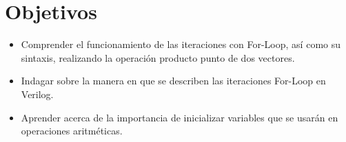 \section{Objetivos \label{sec:obj}}


\begin{itemize} 
	\item Comprender el funcionamiento de las iteraciones con For-Loop, así como su sintaxis, realizando la operación producto punto de dos vectores.
	
	\item Indagar sobre la manera en que se describen las iteraciones For-Loop en Verilog.
	
	\item Aprender acerca de la importancia de inicializar variables que se usarán en operaciones aritméticas.
\end{itemize}